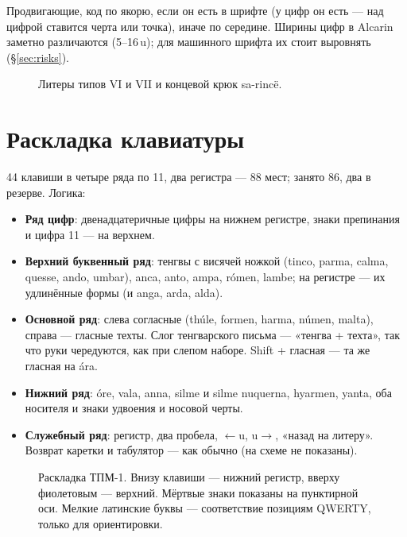 \documentclass[11pt,a4paper]{article}
\newlength\tgem \setlength\tgem{5mm}
\newcommand\tgu{0.001\tgem}
\begin{document}
Продвигающие, код по якорю, если он есть в шрифте (у цифр он есть — над цифрой ставится черта или точка), иначе по середине. Ширины цифр в Alcarin заметно различаются (5--16\,u); для машинного шрифта их стоит выровнять (\S\ref{sec:risks}).

\begin{figure}[h]
\centering
\setlength\tgem{30mm}
\begin{tikzpicture}[x=\tgu,y=\tgu]

\end{tikzpicture}
\caption{Литеры типов VI и VII и концевой крюк sa-rincë.}
\end{figure}

\section{Раскладка клавиатуры}
\label{sec:keyboard}

44 клавиши в четыре ряда по 11, два регистра — 88 мест; занято 86, два в резерве. Логика:

\begin{itemize}
  \item \textbf{Ряд цифр}: двенадцатеричные цифры на нижнем регистре, знаки препинания и цифра 11 — на верхнем.
  \item \textbf{Верхний буквенный ряд}: тенгвы с висячей ножкой (tinco, parma, calma, quesse, ando, umbar), anca, anto, ampa, rómen, lambe; на регистре — их удлинённые формы (и anga, arda, alda).
  \item \textbf{Основной ряд}: слева согласные (thúle, formen, harma, númen, malta), справа — гласные техты. Слог тенгварского письма — «тенгва + техта», так что руки чередуются, как при слепом наборе. Shift + гласная — та же гласная на ára.
  \item \textbf{Нижний ряд}: óre, vala, anna, silme и silme nuquerna, hyarmen, yanta, оба носителя и знаки удвоения и носовой черты.
  \item \textbf{Служебный ряд}: регистр, два пробела, $\leftarrow$u, u$\rightarrow$, «назад на литеру». Возврат каретки и табулятор — как обычно (на схеме не показаны).
\end{itemize}

\begin{figure}[h]
\centering
\begin{tikzpicture}[x=1mm,y=1mm]

\end{tikzpicture}
\caption{Раскладка ТПМ-1. Внизу клавиши — нижний регистр, вверху фиолетовым — верхний. Мёртвые знаки показаны на пунктирной оси. Мелкие латинские буквы — соответствие позициям QWERTY, только для ориентировки.}
\label{fig:kbd}
\end{figure}
\end{document}
